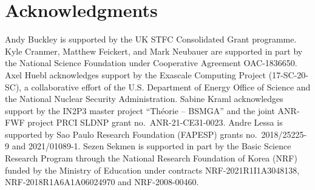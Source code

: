 \documentclass[11pt]{article}
\begin{document}
\section*{Acknowledgments}

Andy Buckley is supported by the UK STFC Consolidated Grant programme.
Kyle Cranmer, Matthew Feickert, and Mark Neubauer are supported in part by the National Science Foundation under Cooperative Agreement OAC-1836650.
Axel Huebl acknowledges support by the Exascale Computing Project (17-SC-20-SC), a collaborative effort of the U.S. Department of Energy Office of Science and the National Nuclear Security Administration.
Sabine Kraml acknowledges support by the IN2P3 master project ``Th\'eorie -- BSMGA'' and the joint ANR-FWF project PRCI SLDNP grant no.~ANR-21-CE31-0023.
Andre Lessa is supported by Sao Paulo Research Foundation (FAPESP) grants no.~2018/25225-9 and 2021/01089-1.
Sezen Sekmen is supported in part by the Basic Science Research Program through the National Research Foundation of Korea (NRF) funded by the Ministry of Education under contracts NRF-2021R1I1A3048138, NRF-2018R1A6A1A06024970 and NRF-2008-00460.


\def\thefootnote{\fnsymbol{footnote}}
\setcounter{footnote}{0}

\clearpage


%
\clearpage
\printglossaries
\end{document}
